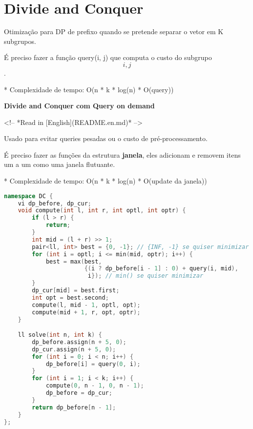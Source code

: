 \documentclass[11pt, a4paper, oneside]{book}
\begin{document}
\hfill

\section{Divide and Conquer}


Otimização para DP de prefixo quando se pretende separar o vetor em K subgrupos.    



É preciso fazer a função query(i, j) que computa o custo do subgrupo \[i, j\].

* Complexidade de tempo: O(n * k * log(n) *  O(query))



\textbf{Divide and Conquer com Query on demand} 



<!-- *Read in [English](README.en.md)* -->



Usado para evitar queries pesadas ou o custo de pré-processamento.  

É preciso fazer as funções da estrutura \textbf{janela}, eles adicionam e removem itens um a um como uma janela flutuante.



* Complexidade de tempo: O(n * k * log(n) * O(update da janela))





\hfill

\begin{multicols}{2}
\begin{lstlisting}[language=C++]
namespace DC {
    vi dp_before, dp_cur;
    void compute(int l, int r, int optl, int optr) {
        if (l > r) {
            return;
        }
        int mid = (l + r) >> 1;
        pair<ll, int> best = {0, -1}; // {INF, -1} se quiser minimizar
        for (int i = optl; i <= min(mid, optr); i++) {
            best = max(best,
                       {(i ? dp_before[i - 1] : 0) + query(i, mid),
                        i}); // min() se quiser minimizar
        }
        dp_cur[mid] = best.first;
        int opt = best.second;
        compute(l, mid - 1, optl, opt);
        compute(mid + 1, r, opt, optr);
    }

    ll solve(int n, int k) {
        dp_before.assign(n + 5, 0);
        dp_cur.assign(n + 5, 0);
        for (int i = 0; i < n; i++) {
            dp_before[i] = query(0, i);
        }
        for (int i = 1; i < k; i++) {
            compute(0, n - 1, 0, n - 1);
            dp_before = dp_cur;
        }
        return dp_before[n - 1];
    }
};
\end{lstlisting}
\end{multicols}
\end{document}
